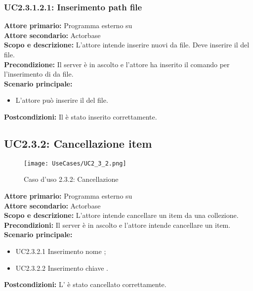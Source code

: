 \documentclass{scalatekids-article}
\begin{document}
\subsubsection{UC2.3.1.2.1: Inserimento path file} %

\textbf{Attore primario:} Programma esterno su \\
\textbf{Attore secondario:} Actorbase\\
\textbf{Scopo e descrizione:} L'attore intende inserire nuovi  da file. Deve inserire il  del file.\\
\textbf{Precondizione:} Il server è in ascolto e l'attore ha inserito il comando per l'inserimento di  da file.\\
\textbf{Scenario principale:}
\begin{itemize}
\item L'attore può inserire il  del file.
\end{itemize}
\textbf{Postcondizioni:} Il  è stato inserito correttamente.

\subsection{UC2.3.2: Cancellazione item}

\begin{figure}[H]
  \begin{center}
    \texttt{[image: UseCases/UC2\_3\_2.png]}
    \caption*{Caso d'uso 2.3.2: Cancellazione }
  \end{center}
\end{figure}
\textbf{Attore primario:} Programma esterno su \\
\textbf{Attore secondario:} Actorbase\\
\textbf{Scopo e descrizione:} L'attore intende cancellare un item da una collezione.\\
\textbf{Precondizioni:} Il server è in ascolto e l'attore intende cancellare un item.\\
\textbf{Scenario principale:}
\begin{itemize}
\item UC2.3.2.1 Inserimento nome ;
\item UC2.3.2.2 Inserimento chiave .
\end{itemize}
\textbf{Postcondizioni:} L' è stato cancellato correttamente.
\end{document}
